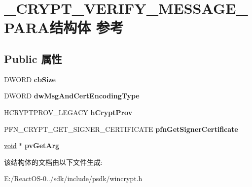 \hypertarget{struct___c_r_y_p_t___v_e_r_i_f_y___m_e_s_s_a_g_e___p_a_r_a}{}\section{\+\_\+\+C\+R\+Y\+P\+T\+\_\+\+V\+E\+R\+I\+F\+Y\+\_\+\+M\+E\+S\+S\+A\+G\+E\+\_\+\+P\+A\+R\+A结构体 参考}
\label{struct___c_r_y_p_t___v_e_r_i_f_y___m_e_s_s_a_g_e___p_a_r_a}
\subsection*{Public 属性}
\begin{DoxyCompactItemize}
\item 
\mbox{\label{struct___c_r_y_p_t___v_e_r_i_f_y___m_e_s_s_a_g_e___p_a_r_a_ac1e23c5e25c81134b99535e008fb2a57}} 
D\+W\+O\+RD {\bfseries cb\+Size}
\item 
\mbox{\label{struct___c_r_y_p_t___v_e_r_i_f_y___m_e_s_s_a_g_e___p_a_r_a_a1074e3651c5c462a588d264cf8d0cfa2}} 
D\+W\+O\+RD {\bfseries dw\+Msg\+And\+Cert\+Encoding\+Type}
\item 
\mbox{\label{struct___c_r_y_p_t___v_e_r_i_f_y___m_e_s_s_a_g_e___p_a_r_a_a2296011cbdcdc53cb7ccf1b40f0e3e00}} 
H\+C\+R\+Y\+P\+T\+P\+R\+O\+V\+\_\+\+L\+E\+G\+A\+CY {\bfseries h\+Crypt\+Prov}
\item 
\mbox{\label{struct___c_r_y_p_t___v_e_r_i_f_y___m_e_s_s_a_g_e___p_a_r_a_ab6344d148361cbd1057c6015a43f8836}} 
P\+F\+N\+\_\+\+C\+R\+Y\+P\+T\+\_\+\+G\+E\+T\+\_\+\+S\+I\+G\+N\+E\+R\+\_\+\+C\+E\+R\+T\+I\+F\+I\+C\+A\+TE {\bfseries pfn\+Get\+Signer\+Certificate}
\item 
\mbox{\label{struct___c_r_y_p_t___v_e_r_i_f_y___m_e_s_s_a_g_e___p_a_r_a_ae1a3a17791723132a6fc81fe9848fe73}} 
\hyperlink{interfacevoid}{void} $\ast$ {\bfseries pv\+Get\+Arg}
\end{DoxyCompactItemize}


该结构体的文档由以下文件生成\+:\begin{DoxyCompactItemize}
\item 
E\+:/\+React\+O\+S-\/0../sdk/include/psdk/wincrypt.\+h\end{DoxyCompactItemize}
